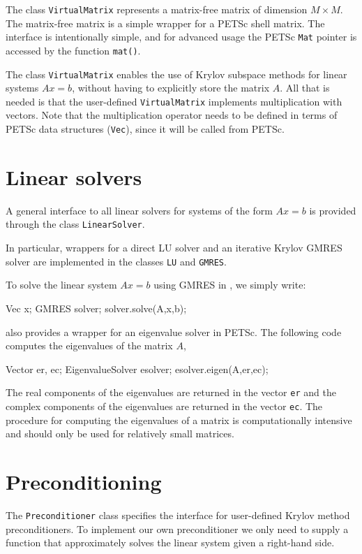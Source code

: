 The \dolfin{} class \texttt{VirtualMatrix} represents a matrix-free 
matrix of dimension $M\times M$. 
The matrix-free matrix is a simple wrapper for a PETSc shell matrix. 
The interface is intentionally simple, and for advanced usage the 
PETSc \texttt{Mat} pointer is accessed by the function \texttt{mat()}.  

The class \texttt{VirtualMatrix} enables the use of Krylov subspace
methods for linear systems $Ax = b$, without having to explicitly
store the matrix $A$. All that is needed is that the user-defined
\texttt{VirtualMatrix} implements multiplication with vectors. 
Note that the multiplication operator needs to be defined in terms of
PETSc data structures (\texttt{Vec}), since it will be called from PETSc.

\section{Linear solvers}

A general interface to all linear solvers for systems of the form 
$Ax=b$ is provided through the class \texttt{LinearSolver}. 

In particular, wrappers for a direct LU solver and an iterative 
Krylov GMRES solver are implemented in the classes \texttt{LU} and \texttt{GMRES}. 

To solve the linear system $Ax=b$ using GMRES in \dolfin{}, we simply write:  
%
\begin{code} 
Vec x;
GMRES solver; 
solver.solve(A,x,b);
\end{code} 
%
\dolfin{} also provides a wrapper for an eigenvalue 
solver in PETSc. The following code computes the 
eigenvalues of the matrix $A$,
\begin{code} 
Vector er, ec;
EigenvalueSolver esolver; 
esolver.eigen(A,er,ec);
\end{code} 
The real components of the eigenvalues are returned in the vector \texttt{er} and
the complex components of the eigenvalues are returned in the vector \texttt{ec}.
The procedure for computing the eigenvalues of a matrix is computationally 
intensive and should only be used for relatively small matrices.


\section{Preconditioning}

The \texttt{Preconditioner} class specifies the interface for user-defined 
Krylov method preconditioners. To implement our own preconditioner we only 
need to supply a function that approximately solves the linear system given 
a right-hand side.

